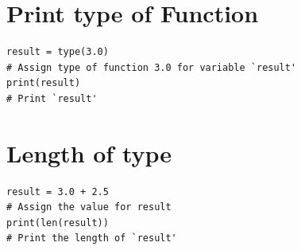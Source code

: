 \documentclass[12pt]{article}
\begin{document}
\section{Print type of Function}
\begin{lstlisting}
result = type(3.0)
# Assign type of function 3.0 for variable `result'
print(result)
# Print `result'
\end{lstlisting}
\pagebreak
\section{Length of type}
\begin{lstlisting}[frame=single]
result = 3.0 + 2.5
# Assign the value for result
print(len(result))
# Print the length of `result'
\end{lstlisting}
\end{document}
